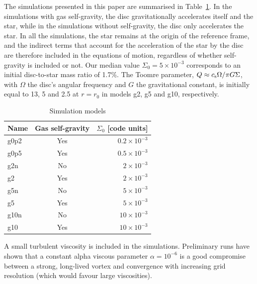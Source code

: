 \documentclass[a4paper,usenatbib]{mnras}
\begin{document}
The simulations presented in this paper are summarised in
Table~\ref{tab:models}. In the simulations with gas self-gravity, the
disc gravitationally accelerates itself and the star, while in the
simulations without self-gravity, the disc only accelerates the
star. In all the simulations, the star remains at the origin of the
reference frame, and the indirect terms that account for the
acceleration of the star by the disc are therefore included in the
equations of motion, regardless of whether self-gravity is included or
not. Our median value $\Sigma_0 = 5\times 10^{-3}$ corresponds to an
initial disc-to-star mass ratio of 1.7\%. The Toomre parameter, $Q
\approx c_{\rm s}\Omega / \pi G \Sigma$, with $\Omega$ the disc's
angular frequency and $G$ the gravitational constant, is initially
equal to 13, 5 and 2.5 at $r=r_0$ in models g2, g5 and g10,
respectively.
\begin{table}
  \centering
  \caption{\label{tab:models}Simulation models}
  \smallskip
  \begin{minipage}{\hsize}
    \centering
    \begin{tabular}{l c r}
      Name & Gas self-gravity & $\Sigma_0$ [code units]\\
      \hline
      \hline
      g0p2 & Yes & $0.2\times10^{-3}$\\
      g0p5 & Yes & $0.5\times10^{-3}$\\
      g2n & No & $2\times10^{-3}$\\
      g2 & Yes & $2\times10^{-3}$\\
      g5n & No & $5\times10^{-3}$\\
      g5 & Yes & $5\times10^{-3}$\\
      g10n & No & $10\times 10^{-3}$\\
      g10 & Yes & $10\times10^{-3}$\\
      \hline
    \end{tabular}\par
  \end{minipage}
\end{table}

A small turbulent viscosity is included in the
simulations. Preliminary runs have shown that a constant alpha viscous
parameter $\alpha = 10^{-6}$ is a good compromise between a strong,
long-lived vortex \citep[which requires low viscosities, particularly
with gas self-gravity as it inhibits the RWI;][]{GN88} and convergence
with increasing grid resolution (which would favour large
viscosities).
\end{document}
